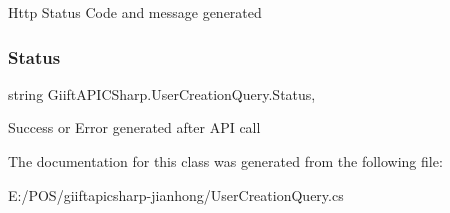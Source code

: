 Http Status Code and message generated 

\mbox{\label{class_giift_a_p_i_c_sharp_1_1_user_creation_query_a9047d8e190092e890d6d39aa8138a4b6}} 
\subsubsection{\texorpdfstring{Status}{Status}}
{\footnotesize\ttfamily string Giift\+A\+P\+I\+C\+Sharp.\+User\+Creation\+Query.\+Status\hspace{0.3cm}{\ttfamily [get]}, {\ttfamily [set]}}



Success or Error generated after A\+PI call 



The documentation for this class was generated from the following file\+:\begin{DoxyCompactItemize}
\item 
E\+:/\+P\+O\+S/giiftapicsharp-\/jianhong/User\+Creation\+Query.\+cs\end{DoxyCompactItemize}
